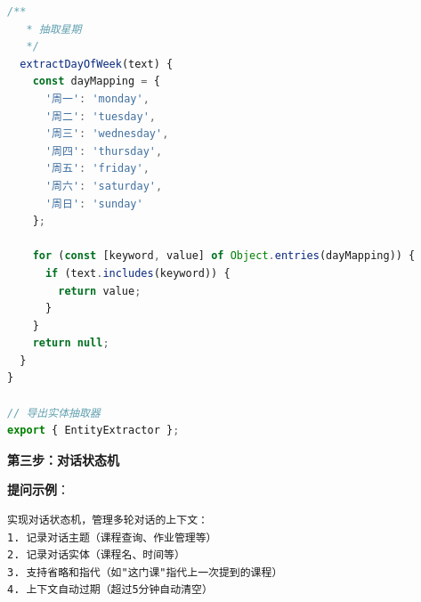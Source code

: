 ﻿\documentclass[12pt,a4paper]{article}
\begin{document}
\begin{lstlisting}[language=JavaScript, caption={实体抽取器}]
  /**
   * 抽取星期
   */
  extractDayOfWeek(text) {
    const dayMapping = {
      '周一': 'monday',
      '周二': 'tuesday',
      '周三': 'wednesday',
      '周四': 'thursday',
      '周五': 'friday',
      '周六': 'saturday',
      '周日': 'sunday'
    };
    
    for (const [keyword, value] of Object.entries(dayMapping)) {
      if (text.includes(keyword)) {
        return value;
      }
    }
    return null;
  }
}

// 导出实体抽取器
export { EntityExtractor };
\end{lstlisting}

\textbf{第三步：对话状态机}

\textbf{提问示例}：
\begin{verbatim}
实现对话状态机，管理多轮对话的上下文：
1. 记录对话主题（课程查询、作业管理等）
2. 记录对话实体（课程名、时间等）
3. 支持省略和指代（如"这门课"指代上一次提到的课程）
4. 上下文自动过期（超过5分钟自动清空）
\end{verbatim}
\end{document}
